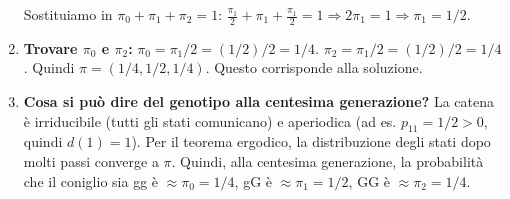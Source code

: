 \documentclass[12pt,a4paper]{article}
\begin{document}
\begin{example}
\begin{enumerate}
    Sostituiamo in $\pi_0 + \pi_1 + \pi_2 = 1$:
    $\frac{\pi_1}{2} + \pi_1 + \frac{\pi_1}{2} = 1 \Rightarrow 2\pi_1 = 1 \Rightarrow \pi_1 = 1/2$.
    \item \textbf{Trovare $\pi_0$ e $\pi_2$:}
    $\pi_0 = \pi_1/2 = (1/2)/2 = 1/4$.
    $\pi_2 = \pi_1/2 = (1/2)/2 = 1/4$.
    Quindi $\pi = (1/4, 1/2, 1/4)$. Questo corrisponde alla soluzione.
    \item \textbf{Cosa si può dire del genotipo alla centesima generazione?}
    La catena è irriducibile (tutti gli stati comunicano) e aperiodica (ad es. $p_{11}=1/2 > 0$, quindi $d(1)=1$). Per il teorema ergodico, la distribuzione degli stati dopo molti passi converge a $\pi$. Quindi, alla centesima generazione, la probabilità che il coniglio sia gg è $\approx \pi_0=1/4$, gG è $\approx \pi_1=1/2$, GG è $\approx \pi_2=1/4$.
\end{enumerate}
\end{example}
\end{document}
